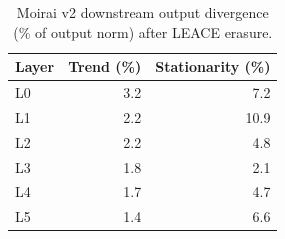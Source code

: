 \documentclass{article}
\begin{document}
\begin{table}[tbp]
\caption{Moirai v2 downstream output divergence (\% of output norm) after LEACE erasure.}
\label{tab:moirai_downstream}
\centering
\begin{tabular}{lrr}
\toprule
Layer & Trend (\%) & Stationarity (\%) \\
\midrule
L0 & 3.2 & 7.2 \\
L1 & 2.2 & 10.9 \\
L2 & 2.2 & 4.8 \\
L3 & 1.8 & 2.1 \\
L4 & 1.7 & 4.7 \\
L5 & 1.4 & 6.6 \\
\bottomrule
\end{tabular}
\end{table}

\newpage

\newpage

\end{document}
